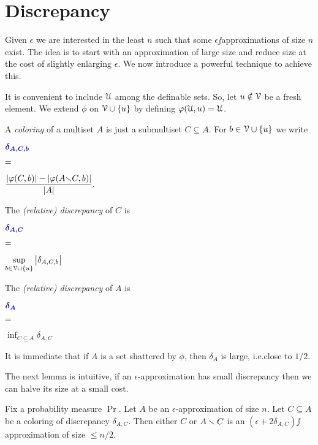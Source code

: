 \documentclass[sputnik.tex]{subfiles}
\begin{document}
\section{Discrepancy}\label{epsilon_approximations}

\def\ceq#1#2#3{\parbox[t]{30ex}{$\displaystyle #1$}\parbox{5ex}{$\displaystyle\hfil #2$}{$\displaystyle #3$}}

Given $\epsilon$ we are interested in the least $n$ such that some $\epsilon\jj$approximations of size $n$ exist.
The idea is to start with an approximation of large size and reduce size at the cost of slightly enlarging $\epsilon$.
We now introduce a powerful technique to achieve this.

It is convenient to include $\EuScript U$ among the definable sets. So, let $u\notin\EuScript V$ be a fresh element.
We extend $\phi$ on $\EuScript V\cup\{u\}$ by defining \emph{$\varphi(\EuScript U,u)=\EuScript U$}.

A \emph{coloring\/} of a multiset $A$ is just a submultiset $C\subseteq A$.
For $b\in\EuScript V\cup\{u\}$ we write 

\ceq{\hfill\emph{$\delta_{A,C,b}$}}{=}{\frac{|\phi(C,b)|-|\phi(A{\sm} C,b)|}{|A|}.}

The \emph{(relative) discrepancy\/} of $C$ is\smallskip

\ceq{\hfill\emph{$\delta_{A,C}$}}{=}{\sup_{b\in\V\cup\{u\}}\big|\delta_{A,C,b}\big|}

The \emph{(relative) discrepancy\/} of $A$ is 

\ceq{\hfill \emph{$\delta_A$}}{=}{\inf_{C\subseteq A}\delta_{A,C}}

\smallskip
It is immediate that if $A$ is a set shattered by $\phi$, then $\delta_A$ is large, i.e.\@ close to $1/2$.

The next lemma is intuitive, if an $\epsilon$-approximation has small discrepancy then we can halve its size at a small cost.

\begin{lemma}\label{lem_aprossimazionediapprossimazione}
Fix a probability measure\/ $\Pr$. Let $A$ be an $\epsilon$-approximation of size $n$.
Let $C\subseteq A$ be a coloring of discrepancy $\delta_{A,C}$.
Then either $C$ or $A\smallsetminus C$ is an $(\epsilon+2\delta_{A,C})\jj$approximation of size $\le n/2$.
\end{lemma}
\end{document}
